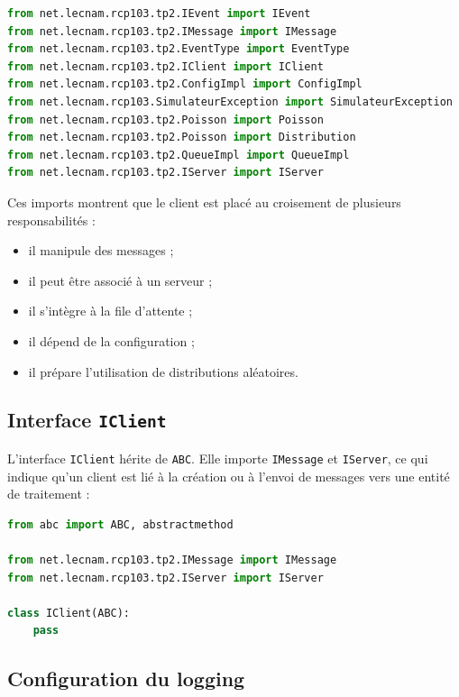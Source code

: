 \documentclass{article}
\begin{document}
\begin{lstlisting}[language=Python, caption=Imports principaux de ClientImpl.py]
from net.lecnam.rcp103.tp2.IEvent import IEvent
from net.lecnam.rcp103.tp2.IMessage import IMessage
from net.lecnam.rcp103.tp2.EventType import EventType
from net.lecnam.rcp103.tp2.IClient import IClient
from net.lecnam.rcp103.tp2.ConfigImpl import ConfigImpl
from net.lecnam.rcp103.SimulateurException import SimulateurException
from net.lecnam.rcp103.tp2.Poisson import Poisson
from net.lecnam.rcp103.tp2.Poisson import Distribution
from net.lecnam.rcp103.tp2.QueueImpl import QueueImpl
from net.lecnam.rcp103.tp2.IServer import IServer
\end{lstlisting}

Ces imports montrent que le client est placé au croisement de plusieurs responsabilités :
\begin{itemize}[leftmargin=*]
    \item il manipule des messages ;
    \item il peut être associé à un serveur ;
    \item il s’intègre à la file d’attente ;
    \item il dépend de la configuration ;
    \item il prépare l’utilisation de distributions aléatoires.
\end{itemize}

\subsection{Interface \texttt{IClient}}

L’interface \texttt{IClient} hérite de \texttt{ABC}. Elle importe \texttt{IMessage} et \texttt{IServer}, ce qui indique qu’un client est lié à la création ou à l’envoi de messages vers une entité de traitement :

\begin{lstlisting}[language=Python, caption=Structure de IClient.py]
from abc import ABC, abstractmethod

from net.lecnam.rcp103.tp2.IMessage import IMessage
from net.lecnam.rcp103.tp2.IServer import IServer

class IClient(ABC):
    pass
\end{lstlisting}

\subsection{Configuration du logging}
\end{document}

